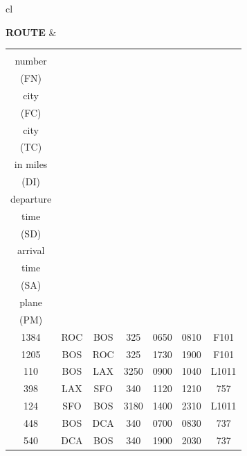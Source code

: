 \documentclass[12pt,a3paper]{article}
\begin{document}
\begin{enumerate}
\begin{center}
\renewcommand{\arraystretch}{1.1} %

\begin{tabular}{cl}

\textbf{ROUTE} & 
\begin{tabular}{ccccccc}
\shortstack{flight \\ number \\ (FN)} & 
\shortstack{from \\ city \\ (FC)} & 
\shortstack{to \\ city \\ (TC)} & 
\shortstack{distance \\ in miles \\ (DI)} & 
\shortstack{scheduled \\ departure \\ time \\ (SD)} & 
\shortstack{scheduled \\ arrival \\ time \\ (SA)} & 
\shortstack{ \\ plane \\ (PM)} \\
\hline
1384 & ROC & BOS & 325 & 0650 & 0810 & F101 \\
1205 & BOS & ROC & 325 & 1730 & 1900 & F101 \\
 110 & BOS & LAX & 3250 & 0900 & 1040 & L1011 \\
 398 & LAX & SFO & 340 & 1120 & 1210 & 757 \\
 124 & SFO & BOS & 3180 & 1400 & 2310 & L1011 \\
 448 & BOS & DCA & 340 & 0700 & 0830 & 737 \\
 540 & DCA & BOS & 340 & 1900 & 2030 & 737 \\
\end{tabular} \\
 \\ %
 \\


\end{tabular}
\end{center}
\end{enumerate}
\end{document}
